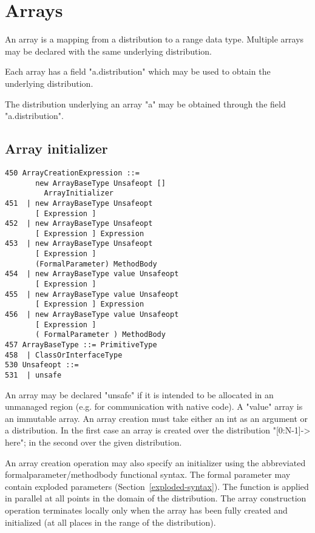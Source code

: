 \chapter{Arrays}\label{XtenArrays}

An array is a mapping from a distribution to a range data
type. Multiple arrays may be declared with the same underlying
distribution. 

Each array has a field \xcd"a.distribution" which may be used to
obtain the underlying
distribution.

The distribution underlying an array \xcd"a" may be obtained through
the field \xcd"a.distribution".



\section{Array initializer}\label{ArrayInitializer}\label{array!creation}

\begin{verbatim}
450 ArrayCreationExpression ::= 
       new ArrayBaseType Unsafeopt [] 
         ArrayInitializer
451  | new ArrayBaseType Unsafeopt 
       [ Expression ]
452  | new ArrayBaseType Unsafeopt 
       [ Expression ] Expression
453  | new ArrayBaseType Unsafeopt 
       [ Expression ] 
       (FormalParameter) MethodBody
454  | new ArrayBaseType value Unsafeopt 
       [ Expression ]
455  | new ArrayBaseType value Unsafeopt 
       [ Expression ] Expression
456  | new ArrayBaseType value Unsafeopt 
       [ Expression ] 
       ( FormalParameter ) MethodBody
457 ArrayBaseType ::= PrimitiveType
458  | ClassOrInterfaceType
530 Unsafeopt ::=
531  | unsafe
\end{verbatim}

An array may be declared \xcd"unsafe" if it is intended to be
allocated in an unmanaged region (e.g.{} for communication with native
code). A \xcd"value" array is an immutable array. An array creation
must take either an int as an argument or a distribution. In the first
case an array is created over the distribution \xcd"[0:N-1]-> here";
in the second over the given distribution. 

An array creation operation may also specify an initializer using the
abbreviated formalparameter/methodbody functional syntax. The formal
parameter may contain exploded parameters
(Section~\ref{exploded-syntax}). The function is applied in parallel
at all points in the domain of the distribution. The array
construction operation terminates locally only when the array has been
fully created and initialized (at all places in the range of the
distribution).

